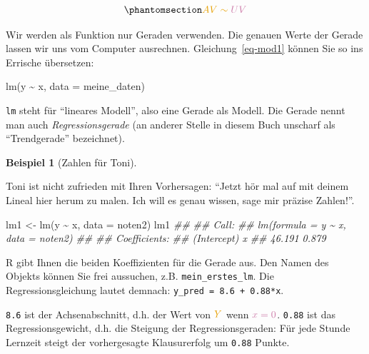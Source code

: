 \documentclass[
  letterpaper,
  twoside,
  open=any]{scrbook}
\newenvironment{Shaded}{\begin{snugshade}}{\end{snugshade}}
\newcommand{\AttributeTok}[1]{\textcolor[rgb]{0.40,0.45,0.13}{#1}}
\newcommand{\DocumentationTok}[1]{\textcolor[rgb]{0.37,0.37,0.37}{\textit{#1}}}
\newcommand{\FunctionTok}[1]{\textcolor[rgb]{0.28,0.35,0.67}{#1}}
\newcommand{\NormalTok}[1]{\textcolor[rgb]{0.00,0.23,0.31}{#1}}
\newcommand{\OtherTok}[1]{\textcolor[rgb]{0.00,0.23,0.31}{#1}}
\newcommand{\SpecialCharTok}[1]{\textcolor[rgb]{0.37,0.37,0.37}{#1}}
\theoremstyle{definition}
\theoremstyle{definition}
\theoremstyle{definition}
\newtheorem{example}{Beispiel}[chapter]
\theoremstyle{remark}
\begin{document}
\begin{equation}\phantomsection\label{eq-mod1}{\color{ycol}{AV} \sim \color{xcol}{UV}}\end{equation}

Wir werden als Funktion nur Geraden verwenden. Die genauen Werte der
Gerade lassen wir uns vom Computer ausrechnen. Gleichung~\ref{eq-mod1}
können Sie so ins Errische übersetzen:

\begin{Shaded}
\begin{Highlighting}[]
\FunctionTok{lm}\NormalTok{(y }\SpecialCharTok{\textasciitilde{}}\NormalTok{ x, }\AttributeTok{data =}\NormalTok{ meine\_daten)}
\end{Highlighting}
\end{Shaded}

\texttt{lm} steht für \enquote{lineares Modell}, also eine Gerade als
Modell. Die Gerade nennt man auch \emph{Regressionsgerade} (an anderer
Stelle in diesem Buch unscharf als \enquote{Trendgerade} bezeichnet).

\begin{example}[Zahlen für
Toni]\protect\hypertarget{exm-noten5}{}\label{exm-noten5}

Toni ist nicht zufrieden mit Ihren Vorhersagen: \enquote{Jetzt hör mal
auf mit deinem Lineal hier herum zu malen. Ich will es genau wissen,
sage mir präzise Zahlen!}.

\end{example}

\begin{Shaded}
\begin{Highlighting}[]
\NormalTok{lm1 }\OtherTok{\textless{}{-}} \FunctionTok{lm}\NormalTok{(y }\SpecialCharTok{\textasciitilde{}}\NormalTok{ x, }\AttributeTok{data =}\NormalTok{ noten2)}
\NormalTok{lm1}
\DocumentationTok{\#\# }
\DocumentationTok{\#\# Call:}
\DocumentationTok{\#\# lm(formula = y \textasciitilde{} x, data = noten2)}
\DocumentationTok{\#\# }
\DocumentationTok{\#\# Coefficients:}
\DocumentationTok{\#\# (Intercept)            x  }
\DocumentationTok{\#\#      46.191        0.879}
\end{Highlighting}
\end{Shaded}

R gibt Ihnen die beiden Koeffizienten für die Gerade aus. Den Namen des
Objekts können Sie frei aussuchen, z.B. \texttt{mein\_erstes\_lm}. Die
Regressionsgleichung lautet demnach:
\texttt{y\_pred\ =\ 8.6\ +\ 0.88*x}.

\texttt{8.6} ist der Achsenabschnitt, d.h. der Wert von
\(\color{ycol}{Y}\) wenn \(\color{xcol}{x}=0\). \texttt{0.88} ist das
Regressionsgewicht, d.h. die Steigung der Regressionsgeraden: Für jede
Stunde Lernzeit steigt der vorhergesagte Klausurerfolg um \texttt{0.88}
Punkte.
\end{document}
